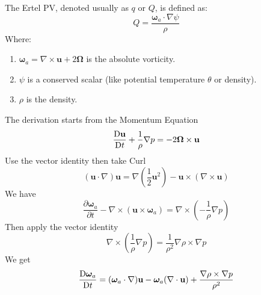 \documentclass[../SQG_notes.tex]{subfiles}
\begin{document}
    \begin{theorem}
        The Ertel PV, denoted usually as $q$ or $Q$, is defined as:
        \begin{equation}
        Q = \frac{\boldsymbol{\omega}_a \cdot \nabla \psi}{\rho} \label{Ertel PV}
        \end{equation}Where:
        \begin{enumerate}
            \item $\boldsymbol{\omega}_a = \nabla \times \mathbf{u} + 2\boldsymbol{\Omega}$ is the absolute vorticity.
            \item $\psi$ is a conserved scalar (like potential temperature $\theta$ or density).
            \item $\rho$ is the density.
        \end{enumerate}
    \end{theorem}
    The derivation starts from the Momentum Equation
    \[\frac{\mathrm{D} \mathbf{u}}{\mathrm{D} t} + \frac{1}{\rho}\nabla p = -2\boldsymbol{\Omega} \times \mathbf{u}\]
    Use the vector identity then take Curl
    \[ (\mathbf{u} \cdot \nabla)\mathbf{u} = \nabla(\frac{1}{2}\mathbf{u}^2) - \mathbf{u} \times (\nabla \times \mathbf{u})\]
    We have 
    \[\frac{\partial \boldsymbol{\omega}_a}{\partial t} - \nabla \times (\mathbf{u} \times \boldsymbol{\omega}_a) = \nabla \times \left( -\frac{1}{\rho}\nabla p \right)\]
    Then apply the vector identity
    \[\nabla \times (\frac{1}{\rho}\nabla p) = \frac{1}{\rho^2} \nabla \rho \times \nabla p\]
    We get 
    \begin{equation}
        \frac{\mathrm{D} \boldsymbol{\omega}_a}{\mathrm{D} t} = (\boldsymbol{\omega}_a \cdot \nabla)\mathbf{u} - \boldsymbol{\omega}_a (\nabla \cdot \mathbf{u}) + \frac{\nabla \rho \times \nabla p}{\rho^2}
    \end{equation}
\end{document}
